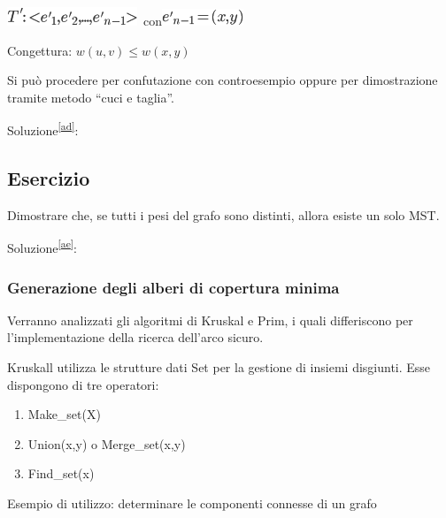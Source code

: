 \documentclass{article}
\providecommand{\tightlist}{%
  \setlength{\itemsep}{0pt}\setlength{\parskip}{0pt}}
\begin{document}
{{\includegraphics{images/image478.png}{~con}\includegraphics{images/image479.png}

{Congettura: }$w(u,v) \leq w(x,y)${~}

{Si può procedere per confutazione con controesempio oppure per dimostrazione tramite metodo ``cuci e taglia''.}

{Soluzione}\textsuperscript{\protect\hyperlink{cmnt30}{{[}ad{]}}}{:}

\subsection{Esercizio}

{Dimostrare che, se tutti i pesi del grafo sono distinti, allora esiste un solo MST.}

{Soluzione}\textsuperscript{\protect\hyperlink{cmnt31}{{[}ae{]}}}{:}

\hypertarget{h.42rszsg7qe80}{\subsubsection{\texorpdfstring{{Generazione degli alberi di copertura minima}}{Generazione degli alberi di copertura minima}}\label{h.42rszsg7qe80}}

\protect\hypertarget{t.89c877068ffb6efc80378955af5aa00fb054212d}{}{}\protect\hypertarget{t.40}{}{}



{Verranno analizzati gli algoritmi di Kruskal e Prim, i quali differiscono per l'implementazione della ricerca dell'arco sicuro.}

{Kruskall utilizza le strutture dati Set per la gestione di insiemi disgiunti. Esse dispongono di tre operatori:}

\begin{enumerate}
\tightlist
\item
  {Make\_set(X)}
\item
  {Union(x,y) o Merge\_set(x,y)}
\item
  {Find\_set(x)}
\end{enumerate}

{Esempio di utilizzo: determinare le componenti connesse di un grafo}



}}
\end{document}
